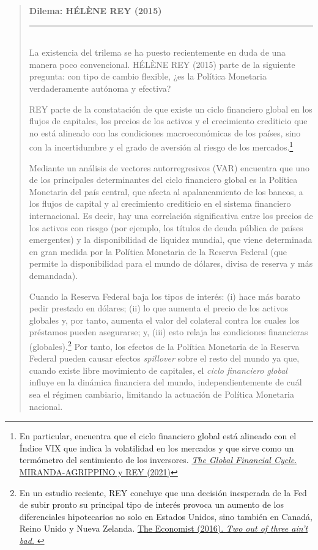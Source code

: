 \documentclass[10pt,a4paper]{article}
\newenvironment{specialblock}[1]{%
      \begin{quote} %
      \small %
      \noindent\textbf{#1}\\[-0.3em] %
      \rule{\linewidth}{0.4pt}\\[0.6em]}{
      \end{quote}}
\begin{document}
\begin{specialblock}{\textbf{Dilema:} HÉLÈNE REY (2015)}
  La existencia del trilema se ha puesto recientemente en duda de una manera poco convencional. HÉLÈNE REY (2015) parte de la siguiente pregunta: con tipo de cambio flexible, ¿es la Política Monetaria verdaderamente autónoma y efectiva?

  REY parte de la constatación de que existe un ciclo financiero global en los flujos de capitales, los precios de los activos y el crecimiento crediticio que no está alineado con las condiciones macroeconómicas de los países, sino con la incertidumbre y el grado de aversión al riesgo de los mercados.\footnote{%
      En particular, encuentra que el ciclo financiero global está alineado con el Índice VIX que indica la volatilidad en los mercados y que sirve como un termómetro del sentimiento de los inversores. \href{http://www.helenerey.eu/Content/_Documents/MirandaAgrippino_Rey_Handbook.pdf}{\textit{The Global Financial Cycle}. MIRANDA-AGRIPPINO y REY (2021)}
  } 

  Mediante un análisis de vectores autorregresivos (VAR) encuentra que uno de los principales determinantes del ciclo financiero global es la Política Monetaria del país central, que afecta al apalancamiento de los bancos, a los flujos de capital y al crecimiento crediticio en el sistema financiero internacional. Es decir, hay una correlación significativa entre los precios de los activos con riesgo (por ejemplo, los títulos de deuda pública de países emergentes) y la disponibilidad de liquidez mundial, que viene determinada en gran medida por la Política Monetaria de la Reserva Federal (que permite la disponibilidad para el mundo de dólares, divisa de reserva y más demandada). 

  Cuando la Reserva Federal baja los tipos de interés: (i) hace más barato pedir prestado en dólares; (ii) lo que aumenta el precio de los activos globales y, por tanto, aumenta el valor del colateral contra los cuales los préstamos pueden asegurarse; y, (iii) esto relaja las condiciones financieras (globales).\footnote{%
      En un estudio reciente, REY concluye que una decisión inesperada de la Fed de subir pronto su principal tipo de interés provoca un aumento de los diferenciales hipotecarios no solo en Estados Unidos, sino también en Canadá, Reino Unido y Nueva Zelanda. \href{https://www.economist.com/schools-brief/2016/08/27/two-out-of-three-aint-bad}{The Economist (2016). \textit{Two out of three ain’t bad. }}
  } Por tanto, los efectos de la Política Monetaria de la Reserva Federal pueden causar efectos \textit{spillover} sobre el resto del mundo ya que, cuando existe libre movimiento de capitales, el \textit{ciclo financiero global} influye en la dinámica financiera del mundo, independientemente de cuál sea el régimen cambiario, limitando la actuación de Política Monetaria nacional.


\end{specialblock}
\end{document}
